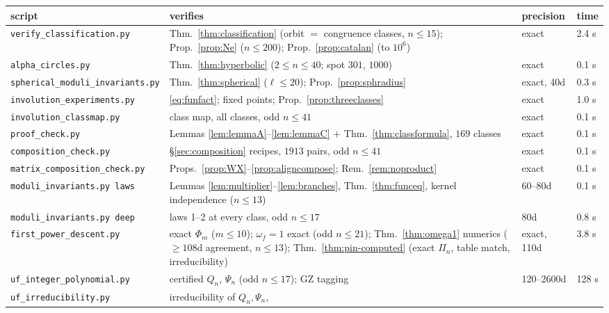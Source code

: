 \documentclass[11pt]{amsart}
\numberwithin{equation}{section}
\theoremstyle{plain}
\theoremstyle{definition}
\theoremstyle{remark}
\begin{document}
\begin{center}
\footnotesize
\setlength{\tabcolsep}{4pt}
\begin{tabular}{@{}p{4.1cm}p{5.6cm}p{1.35cm}p{1.0cm}@{}}
\toprule
script & verifies & precision & time\\
\midrule
\texttt{verify\_\allowbreak classification.py} & Thm.~\ref{thm:classification}
(orbit $=$ congruence classes, $n \le 15$); Prop.~\ref{prop:Ne}
($n \le 200$); Prop.~\ref{prop:catalan} (to $10^6$) & exact & 2.4 s\\
\texttt{alpha\_circles.py} & Thm.~\ref{thm:hyperbolic} ($2 \le n \le
40$; spot $301$, $1000$) & exact & 0.1 s\\
\texttt{spherical\_\allowbreak moduli\_\allowbreak invariants.py} & Thm.~\ref{thm:spherical}
($\ell \le 20$); Prop.~\ref{prop:sphradius} & exact, 40d & 0.3 s\\
\texttt{involution\_\allowbreak experiments.py} & \eqref{eq:funfact}; fixed
points; Prop.~\ref{prop:threeclasses} & exact & 1.0 s\\
\texttt{involution\_\allowbreak classmap.py} & class map, all classes, odd $n \le
41$ & exact & 0.1 s\\
\texttt{proof\_check.py} & Lemmas \ref{lem:lemmaA}--\ref{lem:lemmaC}
$+$ Thm.~\ref{thm:classformula}, $169$ classes & exact & 0.1 s\\
\texttt{composition\_check.py} & \S\ref{sec:composition} recipes,
$1913$ pairs, odd $n \le 41$ & exact & 0.1 s\\
\texttt{matrix\_\allowbreak composition\_\allowbreak check.py} &
Props.~\ref{prop:WX}--\ref{prop:aligncompose};
Rem.~\ref{rem:noproduct} & exact & 0.1 s\\
\texttt{moduli\_invariants.py laws} & Lemmas
\ref{lem:multiplier}--\ref{lem:branches},
Thm.~\ref{thm:funceq}, kernel independence ($n \le 13$) & 60--80d &
0.1 s\\
\texttt{moduli\_invariants.py deep} & laws 1--2 at every class, odd
$n \le 17$ & 80d & 0.8 s\\
\texttt{first\_\allowbreak power\_\allowbreak descent.py} & exact $\Phi_m$ ($m \le 10$);
$\omega_f = 1$ exact (odd $n \le 21$); Thm.~\ref{thm:omega1} numerics
($\ge 108$d agreement, $n \le 13$); Thm.~\ref{thm:pin-computed}
(exact $\Pi_n$, table match, irreducibility) & exact, 110d & 3.8 s\\
\texttt{uf\_integer\_\allowbreak polynomial.py} & certified $Q_n$, $\Psi_n$ (odd
$n \le 17$); GZ tagging & 120--2600d & 128 s\\
\texttt{uf\_irreducibility.py} & irreducibility of $Q_n, \Psi_n$,

\end{tabular}
\end{center}
\end{document}
